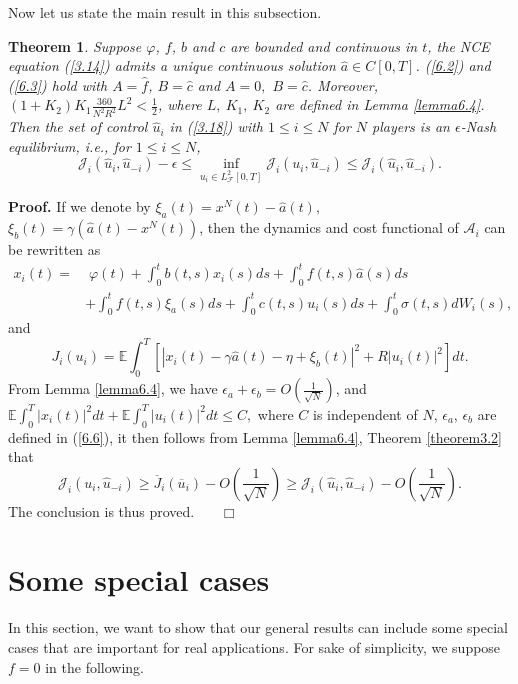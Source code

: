 \documentclass[11pt]{article}
\newtheorem{theorem}{Theorem}[section]
\newenvironment{proof}[1][Proof]{\noindent \textbf{#1.} }{\ \ \  $\Box$}
\def\dbE{\mathbb{E}}
\begin{document}
Now let us state the main result in this subsection.
\begin{theorem}\label{theorem3.3}
Suppose $\varphi$, $f$, $b$ and $c$ are bounded and continuous in
$t$, the NCE equation (\ref{3.14}) admits a unique continuous
solution $\widehat{a}\in C[0,T]$. (\ref{6.2}) and (\ref{6.3}) hold
with $A=\widehat{f}$, $B=\widehat{c}$ and $A=0,$ $B=\widehat{c}$.
Moreover, $(1+K_2)K_1\frac{360}{N^{2}R^2}L^2<\frac 1 2$, where $L,\
K_1,\ K_2$ are defined in Lemma \ref{lemma6.4}. Then the set of
control $\widehat{u}_i$ in (\ref{3.18}) with $1\leq i\leq N$ for $N$
players is an $\epsilon$-Nash equilibrium, i.e., for $1\leq i\leq
N$,
$$\mathcal{J}_i(\widehat{u}_i,\widehat{u}_{-i})-\epsilon\leq
\inf\limits_{u_i\in
L^2_{\mathcal{F}}[0,T]}\mathcal{J}_i(u_i,\widehat{u}_{-i})\leq
\mathcal{J}_i(\widehat{u}_i,\widehat{u}_{-i}).
$$
\end{theorem}
\begin{proof}
If we denote by $\xi_a(t)=x^N(t)-\widehat{a}(t),$
$\xi_b(t)=\gamma(\widehat{a}(t)-x^N(t))$, then the dynamics and cost functional
of $\mathcal{A}_i$ can be rewritten as
%
\begin{align}
x_{i}(t) = & \; \varphi(t)+\int_{0}^{t}b(t,s)x_{i}(s)ds+\int_{0}^{t}f(t,s)\widehat{a}(s)ds \nonumber \\
& +\int_{0}^{t}f(t,s)\xi_{a}(s)ds+\int_{0}^{t}c(t,s)u_{i}(s)ds+\int_{0}^{t}\sigma(t,s)dW_{i}(s), \label{6.21}
\end{align}
%
and
%
\[
J_{i}(u_{i})=\dbE\int_{0}^{T}\left[ |x_{i}(t)-\gamma\widehat{a}(t)-\eta +\xi _{b}(t)|^{2}+R|u_{i}(t)|^{2}\right]dt.
\]
%
From Lemma \ref{lemma6.4}, we have
$\epsilon_a+\epsilon_b=O(\frac{1}{\sqrt{N}})$, and
$\dbE\int_0^T|x_i(t)|^2dt+\dbE\int_0^T|u_i(t)|^2dt\leq C,$ where $C$
is independent of $N$, $\epsilon_a$, $\epsilon_b$ are defined in
(\ref{6.6}), it then follows from Lemma \ref{lemma6.4}, Theorem
\ref{theorem3.2} that
%
\[
\mathcal{J}_i(u_i,\widehat{u}_{-i})\geq \overline{J}_i(\overline{u}_i)-O\left(\frac{1}{\sqrt{N}}\right) \geq \mathcal{J}_i(\widehat{u}_i,\widehat{u}_{-i})-O\left(\frac{1}{\sqrt{N}}\right).
\]
%
The conclusion is thus proved.
\hfill
\end{proof}


\section{Some special cases}

In this section, we want to show that our general results can
include some special cases that are important for real
applications. For sake of simplicity, we suppose $f=0$ in the
following.
\end{document}
